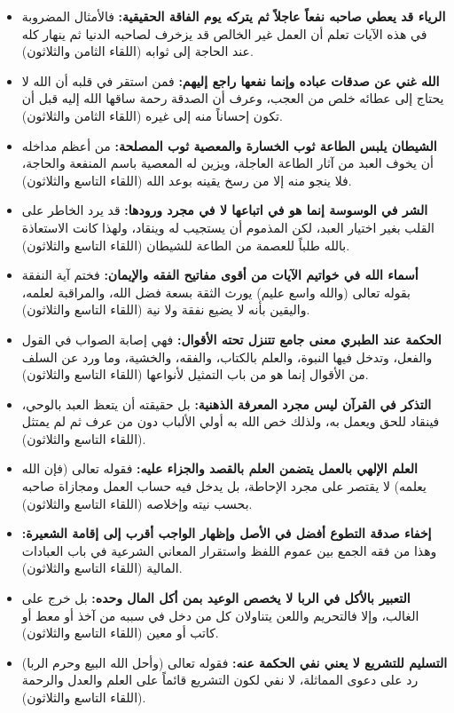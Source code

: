 \begin{itemize}
    \item \textbf{الرياء قد يعطي صاحبه نفعاً عاجلاً ثم يتركه يوم الفاقة الحقيقية:} فالأمثال المضروبة في هذه الآيات تعلم أن العمل غير الخالص قد يزخرف لصاحبه الدنيا ثم ينهار كله عند الحاجة إلى ثوابه (اللقاء الثامن والثلاثون).
    \item \textbf{الله غني عن صدقات عباده وإنما نفعها راجع إليهم:} فمن استقر في قلبه أن الله لا يحتاج إلى عطائه خلص من العجب، وعرف أن الصدقة رحمة ساقها الله إليه قبل أن تكون إحساناً منه إلى غيره (اللقاء الثامن والثلاثون).
    \item \textbf{الشيطان يلبس الطاعة ثوب الخسارة والمعصية ثوب المصلحة:} من أعظم مداخله أن يخوف العبد من آثار الطاعة العاجلة، ويزين له المعصية باسم المنفعة والحاجة، فلا ينجو منه إلا من رسخ يقينه بوعد الله (اللقاء التاسع والثلاثون).
    \item \textbf{الشر في الوسوسة إنما هو في اتباعها لا في مجرد ورودها:} قد يرد الخاطر على القلب بغير اختيار العبد، لكن المذموم أن يستجيب له وينقاد، ولهذا كانت الاستعاذة بالله طلباً للعصمة من الطاعة للشيطان (اللقاء التاسع والثلاثون).
    \item \textbf{أسماء الله في خواتيم الآيات من أقوى مفاتيح الفقه والإيمان:} فختم آية النفقة بقوله تعالى (والله واسع عليم) يورث الثقة بسعة فضل الله، والمراقبة لعلمه، واليقين بأنه لا يضيع نفقة ولا نية (اللقاء التاسع والثلاثون).
    \item \textbf{الحكمة عند الطبري معنى جامع تتنزل تحته الأقوال:} فهي إصابة الصواب في القول والفعل، وتدخل فيها النبوة، والعلم بالكتاب، والفقه، والخشية، وما ورد عن السلف من الأقوال إنما هو من باب التمثيل لأنواعها (اللقاء التاسع والثلاثون).
    \item \textbf{التذكر في القرآن ليس مجرد المعرفة الذهنية:} بل حقيقته أن يتعظ العبد بالوحي، فينقاد للحق ويعمل به، ولذلك خص الله به أولي الألباب دون من عرف ثم لم يمتثل (اللقاء التاسع والثلاثون).
    \item \textbf{العلم الإلهي بالعمل يتضمن العلم بالقصد والجزاء عليه:} فقوله تعالى (فإن الله يعلمه) لا يقتصر على مجرد الإحاطة، بل يدخل فيه حساب العمل ومجازاة صاحبه بحسب نيته وإخلاصه (اللقاء التاسع والثلاثون).
    \item \textbf{إخفاء صدقة التطوع أفضل في الأصل وإظهار الواجب أقرب إلى إقامة الشعيرة:} وهذا من فقه الجمع بين عموم اللفظ واستقرار المعاني الشرعية في باب العبادات المالية (اللقاء التاسع والثلاثون).
    \item \textbf{التعبير بالأكل في الربا لا يخصص الوعيد بمن أكل المال وحده:} بل خرج على الغالب، وإلا فالتحريم واللعن يتناولان كل من دخل في سببه من آخذ أو معط أو كاتب أو معين (اللقاء التاسع والثلاثون).
    \item \textbf{التسليم للتشريع لا يعني نفي الحكمة عنه:} فقوله تعالى (وأحل الله البيع وحرم الربا) رد على دعوى المماثلة، لا نفي لكون التشريع قائماً على العلم والعدل والرحمة (اللقاء التاسع والثلاثون).

\end{itemize}
